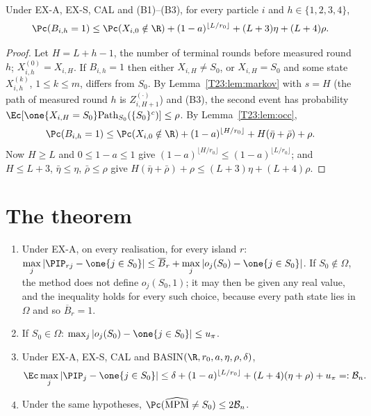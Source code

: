 \documentclass[11pt]{report}
\begin{document}
\begin{T23lemma}\label{T23:lem:round}
Under EX-A, EX-S, CAL and (B1)--(B3), for every particle $i$ and $h\in\{1,2,3,4\}$,
\[
\Pc(B_{i,h}=1)\le\Pc(X_{i,0}\notin\R)+(1-a)^{\lfloor L/r_0\rfloor}+(L+3)\eta+(L+4)\rho .
\]
\end{T23lemma}

\begin{proof}
Let $H=L+h-1$, the number of terminal rounds before measured round $h$; $X^{(0)}_{i,h}=X_{i,H}$. If $B_{i,h}=1$ then either $X_{i,H}\ne S_0$, or $X_{i,H}=S_0$ and some state $X^{(k)}_{i,h}$, $1\le k\le m$, differs from $S_0$. By Lemma~\ref{T23:lem:markov} with $s=H$ (the path of measured round $h$ is $Z^{(\cdot)}_{i,H+1}$) and (B3), the second event has probability $\Ec[\one\{X_{i,H}=S_0\}\mathrm{Path}_{S_0}(\{S_0\}^c)]\le\rho$. By Lemma~\ref{T23:lem:occ},
\[
\Pc(B_{i,h}=1)\le\Pc(X_{i,0}\notin\R)+(1-a)^{\lfloor H/r_0\rfloor}+H(\bar\eta+\bar\rho)+\rho .
\]
Now $H\ge L$ and $0\le1-a\le1$ give $(1-a)^{\lfloor H/r_0\rfloor}\le(1-a)^{\lfloor L/r_0\rfloor}$; and $H\le L+3$, $\bar\eta\le\eta$, $\bar\rho\le\rho$ give $H(\bar\eta+\bar\rho)+\rho\le(L+3)\eta+(L+4)\rho$.
\end{proof}

\section{The theorem}

\begin{T23theorem}[T23(ii)]\label{T23:thm:main}
\begin{enumerate}[label=(\alph*)]
\item Under EX-A, on every realisation, for every island $r$: $\displaystyle\max_j|\PIP_{rj}-\one\{j\in S_0\}|\le\overline B_r+\max_j|o_j(S_0)-\one\{j\in S_0\}|$. If $S_0\notin\Omega$, the method does not define $o_j(S_0,1)$; it may then be given any real value, and the inequality holds for every such choice, because every path state lies in $\Omega$ and so $\overline B_r=1$.
\item If $S_0\in\Omega$: $\max_j|o_j(S_0)-\one\{j\in S_0\}|\le u_\pi$.
\item Under EX-A, EX-S, CAL and BASIN$(\R,r_0,a,\eta,\rho,\delta)$,
\[
\Ec\max_j|\PIP_j-\one\{j\in S_0\}|\le\delta+(1-a)^{\lfloor L/r_0\rfloor}+(L+4)(\eta+\rho)+u_\pi=:\mathcal B_n .
\]
\item Under the same hypotheses, $\Pc(\widehat{\mathrm{MPM}}\neq S_0)\le2\mathcal B_n$.
\end{enumerate}
\end{T23theorem}
\end{document}
